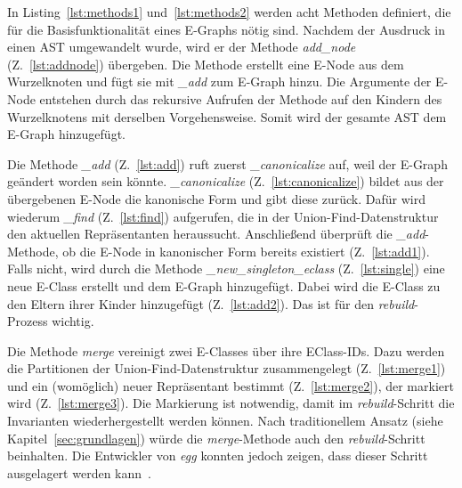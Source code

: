 In Listing~\ref{lst:methods1} und~\ref{lst:methods2} werden acht Methoden definiert, die für die Basisfunktionalität eines E-Graphs nötig sind.
Nachdem der Ausdruck in einen AST umgewandelt wurde, wird er der Methode \textit{add\_node} (Z.~\ref{lst:addnode}) übergeben. Die Methode erstellt eine E-Node aus dem Wurzelknoten
und fügt sie mit \textit{\_add} zum E-Graph hinzu. Die Argumente der E-Node entstehen durch das rekursive Aufrufen der Methode auf den Kindern des Wurzelknotens mit derselben Vorgehensweise.
Somit wird der gesamte AST dem E-Graph hinzugefügt.

Die Methode \textit{\_add} (Z.~\ref{lst:add}) ruft zuerst \textit{\_canonicalize} auf, weil der E-Graph geändert worden sein könnte.
\textit{\_canonicalize} (Z.~\ref{lst:canonicalize}) bildet aus der übergebenen E-Node die kanonische Form und gibt diese zurück.
Dafür wird wiederum \textit{\_find} (Z.~\ref{lst:find}) aufgerufen, die in der Union-Find-Datenstruktur den aktuellen Repräsentanten heraussucht.
Anschließend überprüft die \textit{\_add}-Methode, ob die E-Node in kanonischer Form bereits existiert (Z.~\ref{lst:add1}). Falls nicht, wird durch 
die Methode \textit{\_new\_singleton\_eclass} (Z.~\ref{lst:single}) eine neue E-Class erstellt und dem E-Graph hinzugefügt. Dabei wird die E-Class zu den Eltern
ihrer Kinder hinzugefügt (Z.~\ref{lst:add2}). Das ist für den \textit{rebuild}-Prozess wichtig.

Die Methode \textit{merge} vereinigt zwei E-Classes über ihre EClass-IDs. Dazu werden die Partitionen der Union-Find-Datenstruktur zusammengelegt (Z.~\ref{lst:merge1}) und ein (womöglich)
neuer Repräsentant bestimmt (Z.~\ref{lst:merge2}), der markiert wird (Z.~\ref{lst:merge3}). Die Markierung ist notwendig, damit im \textit{rebuild}-Schritt die Invarianten wiederhergestellt werden können.
Nach traditionellem Ansatz (siehe Kapitel~\ref{sec:grundlagen}) würde die \textit{merge}-Methode auch den \textit{rebuild}-Schritt beinhalten. Die Entwickler von \textit{egg} konnten jedoch
zeigen, dass dieser Schritt ausgelagert werden kann~\cite{2021-egg}.

